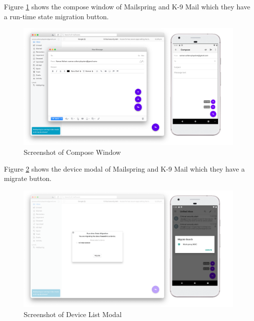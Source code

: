 Figure \ref{fig:adapt-compose} shows the compose window of Mailspring and K-9 Mail which they have a run-time state migration button.

\FloatBarrier
\begin{figure}[H]
    \includegraphics[width=\linewidth]{../figures/adapt-compose.png}
    \centering
    \caption{Screenshot of Compose Window}
    \label{fig:adapt-compose}
\end{figure}
\FloatBarrier

Figure \ref{fig:adapt-modal} shows the device modal of Mailspring and K-9 Mail which they have a migrate button.

\FloatBarrier
\begin{figure}[H]
    \includegraphics[width=\linewidth]{../figures/adapt-modal.png}
    \centering
    \caption{Screenshot of Device List Modal}
    \label{fig:adapt-modal}
\end{figure}
\FloatBarrier


